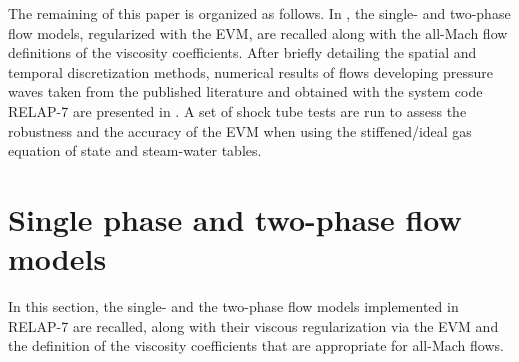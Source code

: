 \documentclass{inputs/mc2015}
\begin{document}
The remaining of this paper is organized as follows. In , the single- and two-phase flow models, regularized with the EVM, are recalled along with the all-Mach flow definitions of the viscosity coefficients. 
After briefly detailing the spatial and temporal discretization methods, numerical results of flows developing pressure waves taken from the published literature and obtained with the system code RELAP-7 are presented in . A set of shock tube tests \cite{Sokolowski-Koszela} are run to assess the robustness and the accuracy of the EVM when using the stiffened/ideal gas equation of state and steam-water tables.
%

%
\section{Single phase and two-phase flow models}\label{sct:model}
%
In this section, the single- and the two-phase flow models implemented in RELAP-7 are recalled, along with their viscous regularization via the EVM
and the definition of the viscosity coefficients that are appropriate for all-Mach flows. %
%
\end{document}
